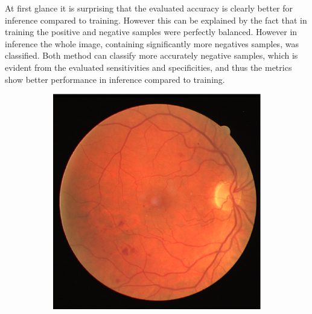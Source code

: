 \documentclass[aps,prb,10pt,twocolumn,groupedaddress]{revtex4-1}
\begin{document}
At first glance it is surprising that the evaluated accuracy is clearly better for inference compared to training. However this can be explained by the fact that in training the positive and negative samples were perfectly balanced. However in inference the whole image, containing significantly more negatives samples, was classified. Both method can classify more accurately negative samples, which is evident from the evaluated sensitivities and specificities, and thus the metrics show better performance in inference compared to training. 
\begin{figure}[!t]
	\centering
	\begin{subfigure}[]{0.22\textwidth}
		\centering
		\includegraphics[width=\textwidth]{images/14_test.eps}
		\caption{}
	\end{subfigure}
	\hspace{0.25cm}
	\centering
	\begin{subfigure}[]{0.22\textwidth}
		\centering

\end{subfigure}
\end{figure}
\end{document}
